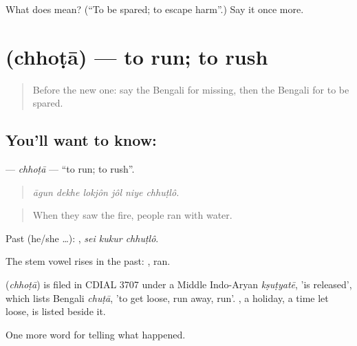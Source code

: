 \begin{tcolorbox}[breakable,colback=teal!4,colframe=teal!35!black,title={Before you move on}]
What does   mean? (\textquotedblleft{}To be spared; to escape harm\textquotedblright{}.) Say it once more.
\end{tcolorbox}
\section[\texorpdfstring{\bn{ছোটা} (chhoṭā)}{ছোটা (chhoṭā)}]{ (chhoṭā) — to run; to rush}

\label{lesson:BN-C281-chhota}



\begin{quote}
Before the new one: say the Bengali for missing, then the Bengali for to be spared.
\end{quote}

\subsection*{You'll want to know: }
\textbf{} — \emph{chhoṭā} — \textquotedblleft{}to run; to rush\textquotedblright{}.

\begin{quote}
     
\end{quote}

\begin{quote}
\emph{āgun dekhe lokjôn jôl niye chhuṭlô.}
\end{quote}

\begin{quote}
When they saw the fire, people ran with water.
\end{quote}

Past (he/she …):   , \emph{sei kukur chhuṭlô}.

The stem vowel rises in the past: , ran.

\begin{cousinweb}
\textbf{} (\emph{chhoṭā}) is filed in CDIAL 3707 under a Middle Indo-Aryan \emph{kṣuṭyatē}, 'is released', which lists Bengali \emph{chuṭā}, 'to get loose, run away, run'. \textbf{}, a holiday, a time let loose, is listed beside it.
\end{cousinweb}

\begin{grammarlens}[title={What you've built}]
One more word for telling what happened.
\end{grammarlens}

